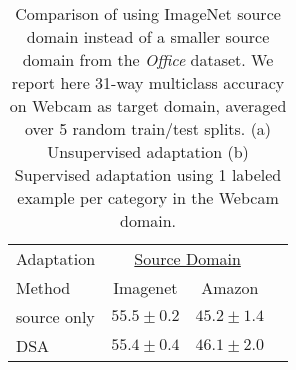 \begin{table*}
\begin{subtable}{0.4\linewidth}
\begin{tabular}{lccc}
\toprule
Adaptation & \multicolumn{2}{c}{\underline{Source Domain}} \\
Method  & Imagenet & Amazon \\
\midrule
source only & $55.5 \pm 0.2$ & $45.2 \pm 1.4$ \\
\midrule
DSA  & $55.4 \pm 0.4$ & $46.1 \pm 2.0$ \\
\bottomrule
\end{tabular}
\end{subtable}
\caption{Comparison of using ImageNet source domain instead of a smaller source domain from the \emph{Office} dataset. We report here 31-way multiclass accuracy on Webcam as target domain, averaged over 5 random train/test splits. (a) Unsupervised adaptation (b) Supervised adaptation using 1 labeled example per category in the Webcam domain.}
\label{tab:imagenet_fc8}
\end{table*}

